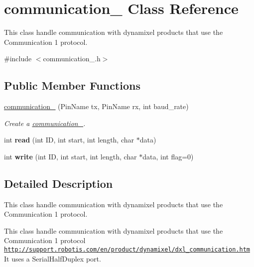 \hypertarget{classcommunication__1}{}\section{communication\+\_ Class Reference}
\label{classcommunication__1}


This class handle communication with dynamixel products that use the Communication 1 protocol.  




{\ttfamily \#include $<$communication\+\_.\+h$>$}

\subsection*{Public Member Functions}
\begin{DoxyCompactItemize}
\item 
\hyperlink{classcommunication__1_a03b0e85ad36aa9bac39d0fc7663c77ca}{communication\+\_} (Pin\+Name tx, Pin\+Name rx, int baud\+\_\+rate)
\begin{DoxyCompactList}\small\item\em Create a \hyperlink{classcommunication__1}{communication\+\_}. \end{DoxyCompactList}\item 
int {\bfseries read} (int ID, int start, int length, char $\ast$data)\hypertarget{classcommunication__1_a81c6441018c25b1d7d3578a97fb0e712}{}\label{classcommunication__1_a81c6441018c25b1d7d3578a97fb0e712}

\item 
int {\bfseries write} (int ID, int start, int length, char $\ast$data, int flag=0)\hypertarget{classcommunication__1_a21d61cc68098426a4f916a1cd6504734}{}\label{classcommunication__1_a21d61cc68098426a4f916a1cd6504734}

\end{DoxyCompactItemize}


\subsection{Detailed Description}
This class handle communication with dynamixel products that use the Communication 1 protocol. 

This class handle communication with dynamixel products that use the Communication 1 protocol \href{http://support.robotis.com/en/product/dynamixel/dxl_communication.htm}{\tt http\+://support.\+robotis.\+com/en/product/dynamixel/dxl\+\_\+communication.\+htm} It uses a Serial\+Half\+Duplex port. 

